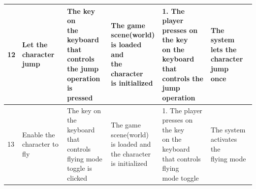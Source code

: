 \documentclass[12pt, titlepage]{article}
\begin{document}
\begin{center}
\begin{longtable}[!bpht]{|m{0.9cm}|m{2.6cm}|m{2.6cm}|m{2.7cm}|m{3.2cm}|m{2.7cm}|}
12 & \makecell[ml]{Let the\\ character jump} & \makecell[ml]{The key on\\ the keyboard\\ that controls\\ the jump\\ operation is\\ pressed} & \makecell[ml]{The game\\ scene(world)\\ is loaded and\\ the character\\ is initialized} & \makecell[ml]{1. The player\\ presses on the key\\ on the keyboard\\ that controls the\\ jump operation} & \makecell[ml]{The system\\ lets the\\ character jump\\ once}\\\hline

13 & \makecell[ml]{Enable the\\ character to\\ fly} & \makecell[ml]{The key on\\ the keyboard\\ that controls\\ flying mode\\ toggle\hspace{-0.5mm} is\hspace{-0.5mm} clicked} & \makecell[ml]{The game\\ scene(world)\\ is loaded and\\ the character\\ is initialized} & \makecell[ml]{1. The player\\ presses on the key\\ on the keyboard\\ that \hspace{-0.5mm}controls \hspace{-0.5mm}flying\\ mode toggle} & \makecell[ml]{The system\\ activates the\\ flying mode}\\\hline


\end{longtable}
\end{center}
\end{document}
